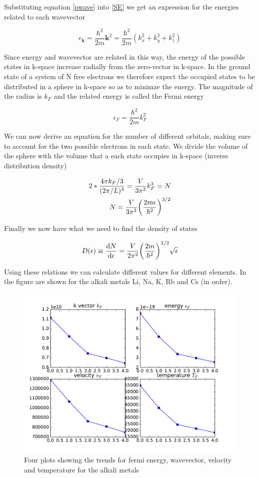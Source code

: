 \documentclass{article}
\begin{document}
Substituting equation \eqref{pwave} into \eqref{SE} we get an expression for the energies related to each wavevector

\begin{equation}
	\epsilon_{\bm{k}} = \frac{\hbar^2}{2m}\bm{k}^2 = \frac{\hbar^2}{2m}(k_x^2+k_y^2+k_z^2)
\end{equation}

Since energy and wavevector are related in this way, the energy of the possible states in k-space increase radially from the zero-vector in k-space. In the ground state of a system of N free electrons we therefore expect the occupied states to be distributed in a sphere in k-space so as to minimze the energy. The magnitude of the radius is $k_F$ and the related energy is called the Fermi energy

\begin{equation}
	\epsilon_F = \frac{\hbar^2}{2m}k_F^2
\end{equation}

We can now derive an equation for the number of different orbitals, making sure to account for the two possible electrons in each state. We divide the volume of the sphere with the volume that a each state occupies in k-space (inverse distribution density)

\begin{align}
	2*\frac{ 4\pi k_F/3 }{(2\pi/L)^3} = \frac{V}{3\pi^2}k_F^3 = N\\
	N = \frac{V}{3\pi^2}\qty(\frac{2m\epsilon}{\hbar^2})^{3/2}
\end{align}

Finally we now have what we need to find the density of states

\begin{equation}
	D(\epsilon) \equiv \dv{N}{\epsilon} = \frac{V}{2\pi^2}\qty(\frac{2m}{\hbar^2})^{3/2}\sqrt{\epsilon}
\end{equation}

\newpage
Using these relations we can calculate different values for different elements. In the figure are shown for the alkali metals Li, Na, K, Rb and Cs (in order). 

\begin{figure}[H]
	\includegraphics[width = 0.7\linewidth]{4plot.pdf}
	\centering
	\caption{Four plots showing the trends for fermi energy, wavevector, velocity and temperature for the alkali metals}
\end{figure}
\end{document}
